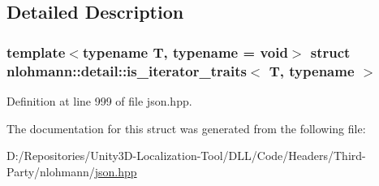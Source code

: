 \subsection{Detailed Description}
\subsubsection*{template$<$typename T, typename = void$>$\newline
struct nlohmann\+::detail\+::is\+\_\+iterator\+\_\+traits$<$ T, typename $>$}



Definition at line 999 of file json.\+hpp.



The documentation for this struct was generated from the following file\+:\begin{DoxyCompactItemize}
\item 
D\+:/\+Repositories/\+Unity3\+D-\/\+Localization-\/\+Tool/\+D\+L\+L/\+Code/\+Headers/\+Third-\/\+Party/nlohmann/\mbox{\hyperlink{json_8hpp}{json.\+hpp}}\end{DoxyCompactItemize}
